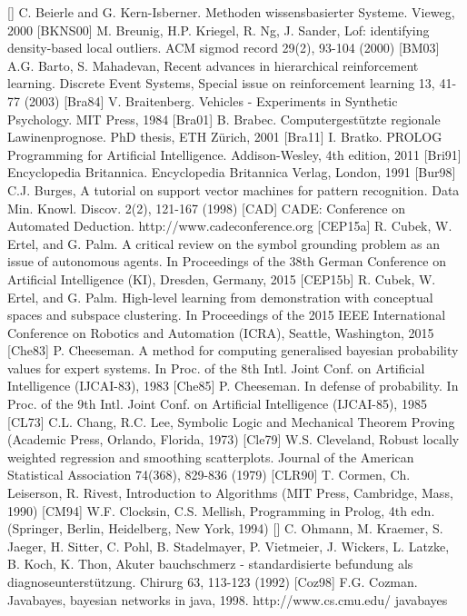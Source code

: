 \documentclass[10pt]{book}
\begin{document}
[\cite{beierle2000methoden}] C. Beierle and G. Kern-Isberner. Methoden wissensbasierter Systeme. Vieweg, 2000
[BKNS00] M. Breunig, H.P. Kriegel, R. Ng, J. Sander, Lof: identifying density-based local outliers. ACM sigmod record 29(2), 93-104 (2000)
[BM03] A.G. Barto, S. Mahadevan, Recent advances in hierarchical reinforcement learning. Discrete Event Systems, Special issue on reinforcement learning 13, 41-77 (2003)
[Bra84] V. Braitenberg. Vehicles - Experiments in Synthetic Psychology. MIT Press, 1984
[Bra01] B. Brabec. Computergestützte regionale Lawinenprognose. PhD thesis, ETH Zürich, 2001
[Bra11] I. Bratko. PROLOG Programming for Artificial Intelligence. Addison-Wesley, 4th edition, 2011
[Bri91] Encyclopedia Britannica. Encyclopedia Britannica Verlag, London, 1991
[Bur98] C.J. Burges, A tutorial on support vector machines for pattern recognition. Data Min. Knowl. Discov. 2(2), 121-167 (1998)
[CAD] CADE: Conference on Automated Deduction. http://www.cadeconference.org
[CEP15a] R. Cubek, W. Ertel, and G. Palm. A critical review on the symbol grounding problem as an issue of autonomous agents. In Proceedings of the 38th German Conference on Artificial Intelligence (KI), Dresden, Germany, 2015
[CEP15b] R. Cubek, W. Ertel, and G. Palm. High-level learning from demonstration with conceptual spaces and subspace clustering. In Proceedings of the 2015 IEEE International Conference on Robotics and Automation (ICRA), Seattle, Washington, 2015
[Che83] P. Cheeseman. A method for computing generalised bayesian probability values for expert systems. In Proc. of the 8th Intl. Joint Conf. on Artificial Intelligence (IJCAI-83), 1983
[Che85] P. Cheeseman. In defense of probability. In Proc. of the 9th Intl. Joint Conf. on Artificial Intelligence (IJCAI-85), 1985
[CL73] C.L. Chang, R.C. Lee, Symbolic Logic and Mechanical Theorem Proving (Academic Press, Orlando, Florida, 1973)
[Cle79] W.S. Cleveland, Robust locally weighted regression and smoothing scatterplots. Journal of the American Statistical Association 74(368), 829-836 (1979)
[CLR90] T. Cormen, Ch. Leiserson, R. Rivest, Introduction to Algorithms (MIT Press, Cambridge, Mass, 1990)
[CM94] W.F. Clocksin, C.S. Mellish, Programming in Prolog, 4th edn. (Springer, Berlin, Heidelberg, New York, 1994)
[\cite{ohmann1992akuter}] C. Ohmann, M. Kraemer, S. Jaeger, H. Sitter, C. Pohl, B. Stadelmayer, P. Vietmeier, J. Wickers, L. Latzke, B. Koch, K. Thon, Akuter bauchschmerz - standardisierte befundung als diagnoseunterstützung. Chirurg 63, 113-123 (1992)
[Coz98] F.G. Cozman. Javabayes, bayesian networks in java, 1998. http://www.cs.cmu.edu/ javabayes
\end{document}
